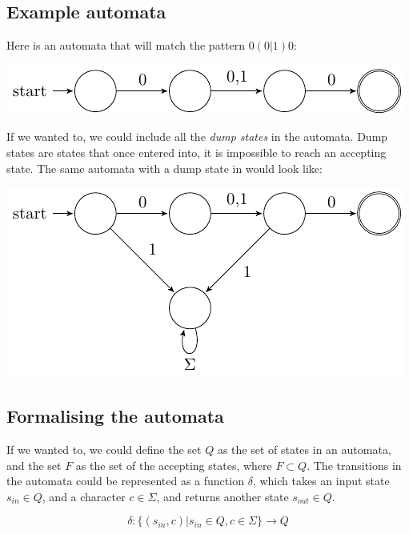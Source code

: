 \subsection*{Example automata}

Here is an automata that will match the pattern $0(0|1)0$:

\begin{center}
  \includegraphics{automata/1.pdf}
\end{center}

If we wanted to, we could include all the {\it dump states} in the automata.
Dump states are states that once entered into, it is impossible to reach an
accepting state. The same automata with a dump state in would look like:

\begin{center}
  \includegraphics{automata/2.pdf}
\end{center}

\subsection*{Formalising the automata}

If we wanted to, we could define the set $Q$ as the set of states in an
automata, and the set $F$ as the set of the accepting states, where $F \subset
Q$. The transitions in the automata could be represented as a function $\delta$,
which takes an input state $s_{in} \in Q$, and a character $c \in \Sigma$, and
returns another state $s_{out} \in Q$.

\[
  \delta:\{(s_{in},c)| s_{in} \in Q, c \in \Sigma\} \rightarrow Q
\]


